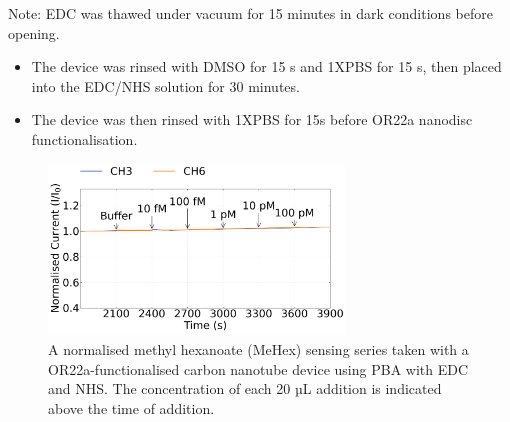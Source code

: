 \documentclass[
  a4paper,
]{scrbook}
\begin{document}
Note: EDC was thawed under vacuum for 15 minutes in dark conditions
before opening.

\begin{itemize}
\item
  The device was rinsed with DMSO for 15 s and 1XPBS for 15 s, then
  placed into the EDC/NHS solution for 30 minutes.
\item
  The device was then rinsed with 1XPBS for 15s before OR22a nanodisc
  functionalisation.
\end{itemize}

\begin{figure}

{\centering \includegraphics[width=0.7\textwidth,height=\textheight]{figures/ch8/NTQ25D3_OR22a_sample_220218_EDCNHS.png}

}

\caption{\label{fig-EDCNHS-sensing}A normalised methyl hexanoate (MeHex)
sensing series taken with a OR22a-functionalised carbon nanotube device
using PBA with EDC and NHS. The concentration of each 20 µL addition is
indicated above the time of addition.}

\end{figure}
\end{document}
